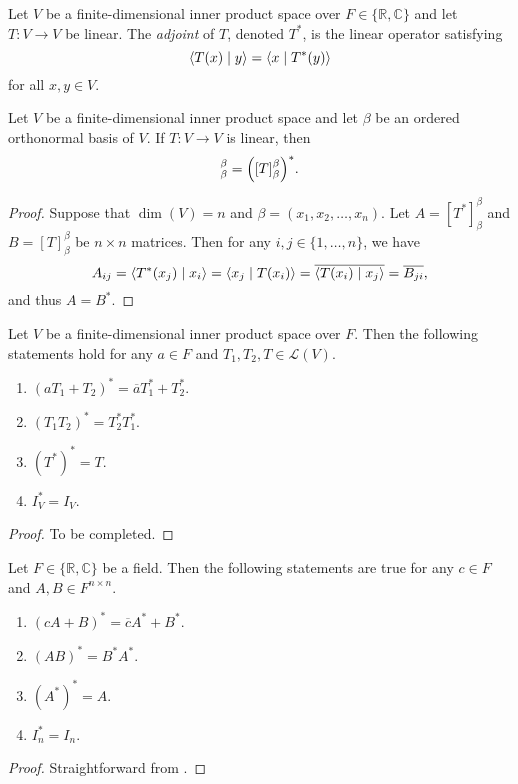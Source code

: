 \begin{definition}
  Let $V$ be a finite-dimensional inner product space over
  $F \in \{\mathbb{R}, \mathbb{C}\}$ and let $T: V \to V$ be linear.
  The \emph{adjoint} of $T$, denoted $T^*$, is the linear operator satisfying
  \begin{equation*}
    \left\langle T(x) \; \middle| \; y \right\rangle = \left\langle x \; \middle| \; T^*(y) \right\rangle
  \end{equation*}
  for all $x, y \in V$.
\end{definition}

\begin{theorem}
  Let $V$ be a finite-dimensional inner product space and let $\beta$ be an
  ordered orthonormal basis of $V$.
  If $T: V \to V$ is linear, then
  \begin{equation*}
    [T^*]_\beta^\beta = \Bigl([T]_\beta^\beta\Bigr)^*.
  \end{equation*}
\end{theorem}
\begin{proof}
  Suppose that $\dim(V) = n$ and $\beta = (x_1, x_2, \dots, x_n)$.
  Let $A = [T^*]_\beta^\beta$ and $B = [T]_\beta^\beta$ be $n \times n$
  matrices.
  Then for any $i, j \in \{1, \dots, n\}$, we have
  \begin{equation*}
    A_{ij}
    = \left\langle T^*(x_j) \; \middle| \; x_i \right\rangle
    = \left\langle x_j \; \middle| \; T(x_i) \right\rangle
    = \overline{\left\langle T(x_i) \; \middle| \; x_j \right\rangle}
    = \overline{B_{ji}},
  \end{equation*}
  and thus $A = B^*$.
\end{proof}

\begin{theorem}
  \label{thm:adjoint-properties}
  Let $V$ be a finite-dimensional inner product space over $F$.
  Then the following statements hold for any $a \in F$ and $T_1, T_2, T \in
  \mathcal{L}(V)$.
  \begin{enumerate}
    \item $(aT_1 + T_2)^* = \overline{a}T_1^* + T_2^*$.
    \item $(T_1T_2)^* = T_2^*T_1^*$.
    \item $(T^*)^* = T$.
    \item $I_V^* = I_V$.
  \end{enumerate}
\end{theorem}
\begin{proof}
  To be completed.
\end{proof}

\begin{corollary}
  Let $F \in \{\mathbb{R}, \mathbb{C}\}$ be a field.
  Then the following statements are true for any $c \in F$ and
  $A, B \in F^{n \times n}$.
  \begin{enumerate}
    \item $(cA + B)^* = \overline{c}A^* + B^*$.
    \item $(AB)^* = B^*A^*$.
    \item $(A^*)^* = A$.
    \item $I_n^* = I_n$.
  \end{enumerate}
\end{corollary}
\begin{proof}
  Straightforward from .
\end{proof}

